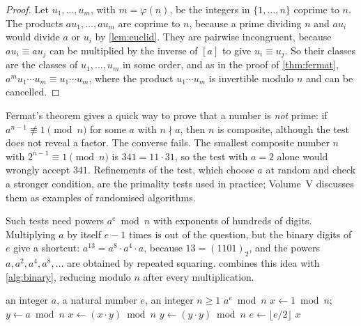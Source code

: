 \begin{proof}
Let $u_1,\ldots,u_m$, with $m=\varphi(n)$, be the integers in $\{1,\ldots,n\}$ coprime to $n$. The products $au_1,\ldots,au_m$ are coprime to $n$, because a prime dividing $n$ and $au_i$ would divide $a$ or $u_i$ by \cref{lem:euclid}. They are pairwise incongruent, because $au_i\equiv au_j$ can be multiplied by the inverse of $[a]$ to give $u_i\equiv u_j$. So their classes are the classes of $u_1,\ldots,u_m$ in some order, and as in the proof of \cref{thm:fermat}, $a^mu_1\cdots u_m\equiv u_1\cdots u_m$, where the product $u_1\cdots u_m$ is invertible modulo $n$ and can be cancelled.
\end{proof}

Fermat's theorem gives a quick way to prove that a number is \emph{not} prime: if $a^{n-1}\not\equiv1\pmod n$ for some $a$ with $n\nmid a$, then $n$ is composite, although the test does not reveal a factor. The converse fails. The smallest composite number $n$ with $2^{n-1}\equiv1\pmod n$ is $341=11\cdot31$, so the test with $a=2$ alone would wrongly accept $341$. Refinements of the test, which choose $a$ at random and check a stronger condition, are the primality tests used in practice; Volume~V discusses them as examples of randomised algorithms.

Such tests need powers $a^e\bmod n$ with exponents of hundreds of digits. Multiplying $a$ by itself $e-1$ times is out of the question, but the binary digits of $e$ give a shortcut: $a^{13}=a^8\cdot a^4\cdot a$, because $13=(1101)_2$, and the powers $a,a^2,a^4,a^8,\ldots$ are obtained by repeated squaring.  combines this idea with \cref{alg:binary}, reducing modulo $n$ after every multiplication.

\begin{algorithm}
\begin{algorithmic}[1]
\Require an integer $a$, a natural number $e$, an integer $n\ge1$
\Ensure $a^e\bmod n$
\State $x\gets1\bmod n$; \ $y\gets a\bmod n$
 
    \State $x\gets(x\cdot y)\bmod n$
  \EndIf
  \State $y\gets(y\cdot y)\bmod n$
  \State $e\gets\lfloor e/2\rfloor$
\EndWhile
\State \Return $x$
\end{algorithmic}
\caption{Modular exponentiation by repeated squaring; $e_0$ denotes the input value of $e$. The loop runs once for each binary digit of $e_0$.}
\label{alg:powmod}
\end{algorithm}

